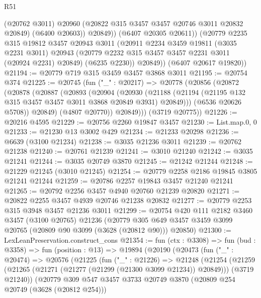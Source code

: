 \begin{lexlean}{R51}
\begin{coremodule}
                (@20762 @3011)
                @20960
                (@20822 @315 @3457 @3457 @20746 @3011 @20832 @20849)
                (@6400 @20603))
              @20849))
          (@6407 @20305 @20611))
        (@20779
          @2235
          @315
          @19812
          @3457
          @20943
          @3011
          (@20911
            @2234
            @3459
            @19811
            (@3035 @2231 @3011)
            @20943
            (@20779 @2232 @315 @3457 @3457 @2231 @3011 (@20924 @2231) @20849)
            (@6235 @2230))
          @20849))
      (@6407 @20617 @19820))
@21194 := @20779 @719 @315 @3459 @3457 @3868 @3011
@21195 := @20754 @374
@21225 := @20745
    (fun ("_" : @20217) =>
    @20778
      (@20856
        (@20872
          (@20878
            (@20887
              (@20893
                (@20904
                  (@20930
                    (@21188
                      (@21194 (@21195 @132 @315 @3457 @3457 @3011 @3868 @20849 @3931) @20849)))
                  (@6536 @20626 @5708))
                @20849)
              (@4807 @20770))
            @20849)))
      (@3719 @20775))
@21226 := @20216 @4595
@21229 := @20756 @2260 @19847 @3457
@21230 := List.map.{0, 0}
@21233 := @21230 @13 @3002 @429
@21234 := @21233 @20298
@21236 := @6639 (@3100 @21234)
@21238 := @3035 @21236 @3011
@21239 := @20762 @21238
@21240 := @20761 @21239
@21241 := @3010 @21240
@21242 := @3035 @21241
@21244 := @3035 @20749 @3870
@21245 := @21242 @21244
@21248 := @21229 @21245 (@3010 @21245)
@21254 := @20779 @2258 @2186 @19845 @3805 @21241 @21244
@21259 := @20786 @2257 @19843 @3457 @21240 @21241
@21265 := @20792 @2256 @3457 @4940 @20760 @21239 @20820
@21271 := @20822 @2255 @3457 @4939 @20746 @21238 @20832
@21277 := @20779 @2253 @315 @3948 @3457 @21236 @3011
@21299 := @20754
    @420
    @111
    @2182
    @3460
    @3457
    (@3100 @20765)
    @21236
    (@20779 @305 @649 @3457 @3459 @3099 @20765 (@20809 @90 @3099 (@3628 (@20812 @90))) @20850)
@21300 := LexLeanPreservation.construct_cons
@21354 := fun (ctx : @3308) =>
  fun (bud : @3358) =>
  fun (position : @13) =>
  @19894
    (@20190
      (@20473
        (fun ("_" : @20474) =>
        @20576
          (@21225
            (fun ("_" : @21226) =>
            @21248
              (@21254
                (@21259
                  (@21265 (@21271 (@21277 (@21299 (@21300 @3099 @21234)) @20849)))
                  (@3719 @21240))
                (@20779
                  @309
                  @547
                  @3457
                  @3733
                  @20749
                  @3870
                  (@20809 @254 @20749 (@3628 (@20812 @254)))

\end{coremodule}
\end{lexlean}
